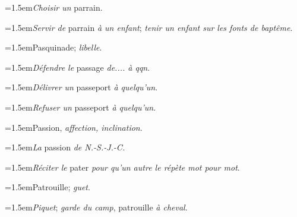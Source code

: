 \par{\dictfontsize\hangindent=1.5em\noindent \textit{Choisir un} parrain. \par}
\par{\dictfontsize\hangindent=1.5em\noindent \textit{Servir de} parrain \textit{à un enfant}; \textit{tenir un enfant sur les fonts de baptême}. \par}
\par{\dictfontsize\hangindent=1.5em\noindent Pasquinade; \textit{libelle}. \par}
\par{\dictfontsize\hangindent=1.5em\noindent \textit{Défendre le} passage \textit{de.... à qqn}. \par}
\par{\dictfontsize\hangindent=1.5em\noindent \textit{Délivrer un} passeport \textit{à quelqu’un}. \par}
\par{\dictfontsize\hangindent=1.5em\noindent \textit{Refuser un} passeport \textit{à quelqu’un}. \par}
\par{\dictfontsize\hangindent=1.5em\noindent Passion, \textit{affection, inclination}. \par}
\par{\dictfontsize\hangindent=1.5em\noindent \textit{La} passion \textit{de N.-S.-J.-C.} \par}
\par{\dictfontsize\hangindent=1.5em\noindent \textit{Réciter le} pater \textit{pour qu’un autre le répète mot pour mot}. \par}
\par{\dictfontsize\hangindent=1.5em\noindent Patrouille; \textit{guet}. \par}
\par{\dictfontsize\hangindent=1.5em\noindent \textit{Piquet}; \textit{garde du camp}, patrouille \textit{à cheval}. \par}
